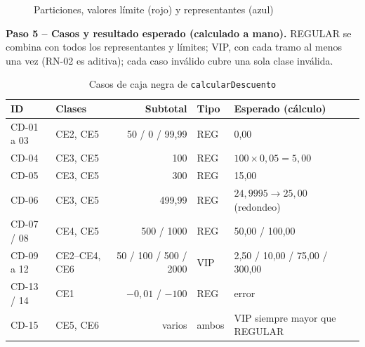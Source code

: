 \documentclass[11pt,a4paper,oneside]{report}
\newcommand{\code}[1]{\texttt{#1}}
\begin{document}
\begin{figure}[H]
\centering
{}
\caption{Particiones, valores límite (rojo) y representantes (azul)}
\end{figure}

\textbf{Paso 5 -- Casos y resultado esperado (calculado a mano).} REGULAR se combina con todos los representantes y límites; VIP, con cada tramo al menos una vez (RN-02 es aditiva); cada caso inválido cubre una sola clase inválida.

\begin{table}[H]
\centering
\caption{Casos de caja negra de \code{calcularDescuento}}
\small
\begin{tabular}{llrll}
\toprule
\textbf{ID} & \textbf{Clases} & \textbf{Subtotal} & \textbf{Tipo} & \textbf{Esperado (cálculo)}\\
\midrule
CD-01 a 03 & CE2, CE5 & 50 / 0 / 99,99 & REG & 0,00\\
CD-04 & CE3, CE5 & 100 & REG & $100 \times 0{,}05 = 5{,}00$\\
CD-05 & CE3, CE5 & 300 & REG & 15,00\\
CD-06 & CE3, CE5 & 499,99 & REG & $24{,}9995 \rightarrow 25{,}00$ (redondeo)\\
CD-07 / 08 & CE4, CE5 & 500 / 1000 & REG & 50,00 / 100,00\\
CD-09 a 12 & CE2--CE4, CE6 & 50 / 100 / 500 / 2000 & VIP & 2,50 / 10,00 / 75,00 / 300,00\\
CD-13 / 14 & CE1 & $-0{,}01$ / $-100$ & REG & error\\
CD-15 & CE5, CE6 & varios & ambos & VIP siempre mayor que REGULAR\\
\bottomrule
\end{tabular}
\end{table}
\end{document}

